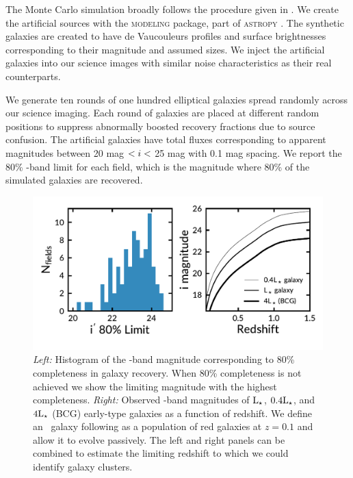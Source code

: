 \documentclass[apj, revtex4-1]{emulateapj}
\begin{document}
The Monte Carlo simulation broadly follows the procedure given in \cite{Menanteau2010a}. We create the artificial sources with the \textsc{modeling} package, part of \textsc{astropy} \citep{TheAstropyCollaboration2013}. The synthetic galaxies are created to have de Vaucouleurs \citep{DeVaucouleurs1948} profiles and surface brightnesses corresponding to their magnitude and assumed sizes. We inject the artificial galaxies into our science images with similar noise characteristics as their real counterparts.

We generate ten rounds of one hundred elliptical galaxies spread randomly across our science imaging. Each round of galaxies are placed at different random positions to suppress abnormally boosted recovery fractions due to source confusion. The artificial galaxies have total fluxes corresponding to apparent magnitudes between 20 mag $< \hbox{$i$} <$ 25 mag with 0.1 mag spacing. We report the 80\% \sdssi-band limit for each field, which is the magnitude where 80\% of the simulated galaxies are recovered.

\begin{figure}
	\includegraphics[width=\textwidth]{figures/recovery_redshift.pdf}
	\caption{\textit{Left:} Histogram of the \sdssi-band magnitude corresponding to 80\% completeness in galaxy recovery. When 80\% completeness is not achieved we show the limiting magnitude with the highest completeness. \textit{Right:} Observed \sdssi-band magnitudes of $\hbox{L$_{\star}$}$, $0.4\hbox{L$_{\star}$}$, and $4\hbox{L$_{\star}$}$ (BCG) early-type galaxies as a function of redshift. We define an \lstar\ galaxy following \cite{Blanton2003} as a population of red galaxies at $z = 0.1$ and allow it to evolve passively. The left and right panels can be combined to estimate the limiting redshift to which we could identify galaxy clusters.}
	\label{fig:recovery_redshift}
\end{figure}
\end{document}
